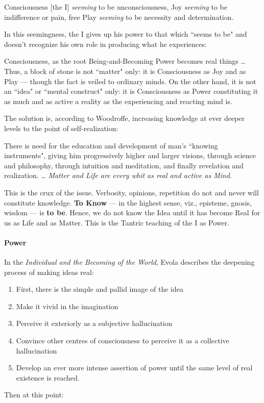 \begin{quotex}
Consciousness [the I] \emph{seeming} to be unconsciousness, Joy \emph{seeming} to be indifference or pain, free Play \emph{seeming} to be necessity and determination. 

\end{quotex}
In this seemingness, the I gives up his power to that which ``seems to be" and doesn't recognize his own role in producing what he experiences:

\begin{quotex}
Consciousness, as the root Being-and-Becoming Power becomes real things … Thus, a block of stone is not ``matter" only: it is Consciousness as Joy and as Play — though the fact is veiled to ordinary minds. On the other hand, it is not an ``idea" or ``mental construct" only: it is Consciousness as Power constituting it as much and as active a reality as the experiencing and reacting mind is. 

\end{quotex}
The solution is, according to Woodroffe, increasing knowledge at ever deeper levels to the point of self-realization:

\begin{quotex}
There is need for the education and development of man's ``knowing instruments", giving him progressively higher and larger visions, through science and philosophy, through intuition and meditation, and finally revelation and realization. … \emph{Matter and Life are every whit as real and active as Mind}.

\end{quotex}
This is the crux of the issue. Verbosity, opinions, repetition do not and never will constitute knowledge. \textbf{To Know} — in the highest sense, viz., episteme, gnosis, wisdom — is \textbf{to be}. Hence, we do not know the Idea until it has become Real for us as Life and as Matter. This is the Tantric teaching of the I as Power.

\paragraph{Power}
In the \emph{Individual and the Becoming of the World}, Evola describes the deepening process of making ideas real:

\begin{enumerate}
\item First, there is the simple and pallid image of the idea 
\item Make it vivid in the imagination 
\item Perceive it exteriorly as a subjective hallucination 
\item Convince other centres of consciousness to perceive it as a collective hallucination 
\item Develop an ever more intense assertion of power until the same level of real existence is reached. 
\end{enumerate}
Then at this point:

